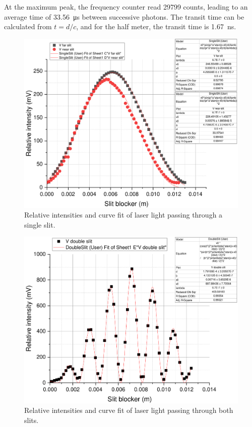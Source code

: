 \documentclass[notitlepage]{report}
\begin{document}
	At the maximum peak, the frequency counter read 29799 counts, leading to an average time of \SI{33.56}{\us} between successive photons. The transit time can be calculated from $t=d/c$, and for the half meter, the transit time is \SI{1.67}{\ns}.
		

	
	\begin{figure}[p]
		\centering
		\includegraphics[width=0.7\linewidth]{Graph6}
		\caption{Relative intensities and curve fit of laser light passing through a single slit.}
		\label{fig:graph6}
	\end{figure}
	
	\begin{figure}[p]
		\centering
		\includegraphics[width=0.7\linewidth]{Graph7}
		\caption{Relative intensities and curve fit of laser light passing through both slits.}
		\label{fig:graph7}
	\end{figure}
	
\end{document}

